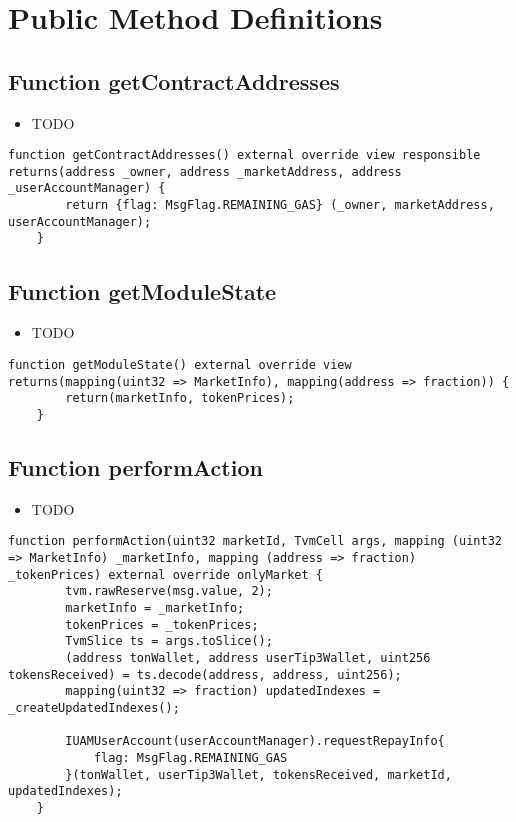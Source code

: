 \section{Public Method Definitions}


\subsection{Function getContractAddresses}

\noindent\begin{itemize}
\item TODO
\end{itemize}

\begin{lstlisting}[firstnumber=79]
    function getContractAddresses() external override view responsible returns(address _owner, address _marketAddress, address _userAccountManager) {
        return {flag: MsgFlag.REMAINING_GAS} (_owner, marketAddress, userAccountManager);
    }
\end{lstlisting}

\subsection{Function getModuleState}

\noindent\begin{itemize}
\item TODO
\end{itemize}

\begin{lstlisting}[firstnumber=63]
    function getModuleState() external override view returns(mapping(uint32 => MarketInfo), mapping(address => fraction)) {
        return(marketInfo, tokenPrices);
    }
\end{lstlisting}

\subsection{Function performAction}

\noindent\begin{itemize}
\item TODO
\end{itemize}

\begin{lstlisting}[firstnumber=90]
    function performAction(uint32 marketId, TvmCell args, mapping (uint32 => MarketInfo) _marketInfo, mapping (address => fraction) _tokenPrices) external override onlyMarket {
        tvm.rawReserve(msg.value, 2);
        marketInfo = _marketInfo;
        tokenPrices = _tokenPrices;
        TvmSlice ts = args.toSlice();
        (address tonWallet, address userTip3Wallet, uint256 tokensReceived) = ts.decode(address, address, uint256);
        mapping(uint32 => fraction) updatedIndexes = _createUpdatedIndexes();

        IUAMUserAccount(userAccountManager).requestRepayInfo{
            flag: MsgFlag.REMAINING_GAS
        }(tonWallet, userTip3Wallet, tokensReceived, marketId, updatedIndexes);
    }
\end{lstlisting}

